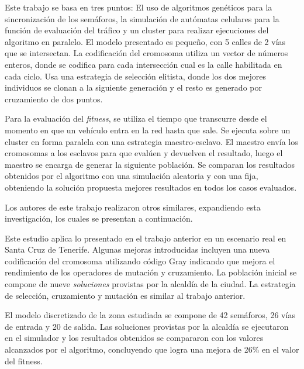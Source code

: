 \begin{itemize}
\begin{item}

Este trabajo se basa en tres puntos: El uso de algoritmos genéticos para la sincronización de los semáforos, la simulación de autómatas celulares para la función de evaluación del tráfico y un cluster para realizar ejecuciones del algoritmo en paralelo.
El modelo presentado es pequeño, con 5 calles de 2 vías que se intersectan. La codificación del cromosoma utiliza un vector de números enteros, donde se codifica para cada intersección cual es la calle habilitada en cada ciclo. Usa una estrategia de selección elitista, donde los dos mejores individuos se clonan a la siguiente generación y el resto es generado por cruzamiento de dos puntos.

Para la evaluación del \emph{fitness}, se utiliza el tiempo que transcurre desde el momento en que un vehículo entra en la red hasta que sale. Se ejecuta sobre un cluster en forma paralela con una estrategia maestro-esclavo. El maestro envía los cromosomas a los esclavos para que evalúen y devuelven el resultado, luego el maestro se encarga de generar la siguiente población.
Se comparan los resultados obtenidos por el algoritmo con una simulación aleatoria y con una fija, obteniendo la solución propuesta mejores resultados en todos los casos evaluados.
	
Los autores de este trabajo realizaron otros similares, expandiendo esta investigación, los cuales se presentan a continuación.
\end{item}
	
\begin{item}

Este estudio aplica lo presentado en el trabajo anterior en un escenario real en Santa Cruz de Tenerife. Algunas mejoras introducidas incluyen una nueva codificación del cromosoma utilizando código Gray indicando que mejora el rendimiento de los operadores de mutación y cruzamiento. La población inicial se compone de nueve \emph{soluciones} provistas por la alcaldía de la ciudad. La estrategia de selección, cruzamiento y mutación es similar al trabajo anterior.

El modelo discretizado de la zona estudiada se compone de 42 semáforos, 26 vías de entrada y 20 de salida. Las soluciones provistas por la alcaldía se ejecutaron en el simulador y los resultados obtenidos se compararon con los valores alcanzados  por el algoritmo, concluyendo que logra una mejora de 26\% en el valor del fitness.


\end{item}
\end{itemize}
